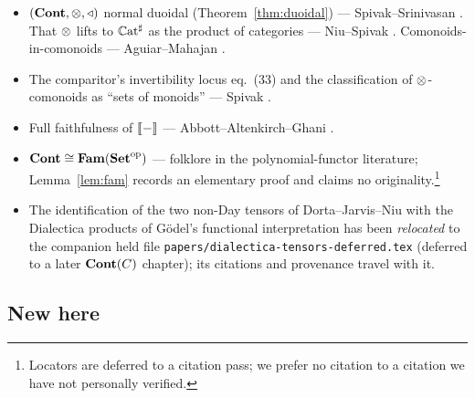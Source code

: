 \begin{itemize}[nosep]
  container is a polynomial comonad), with cofunctors for morphisms ---
  Ahman--Uustalu \cite{AhmanUustalu}; in $\tri$-comonoid form the $\mathcal C=1$
  case of Dorta--Jarvis--Niu \cite[Thm.~4.3]{DJN23}. We claim no part of this
  identification as new: only its Lean formalisation
  (\texttt{Comonoid.lean}, \texttt{ComonoidConverse.lean}, both round trips) is
  ours, and we believe it the first machine-checked proof of the equivalence.
\item $(\mathbf{Cont},\mathbin{\otimes},\mathbin{\triangleleft})$ normal duoidal (Theorem~\ref{thm:duoidal}) ---
  Spivak--Srinivasan \cite[eq.~(29)]{SpivakSrinivasan}. That $\mathbin{\otimes}$ lifts to
  $\mathbb{C}\mathrm{at}^{\sharp}$ as the product of categories --- Niu--Spivak
  \cite[Prop.~8.79]{NiuSpivak}. Comonoids-in-comonoids --- Aguiar--Mahajan
  \cite{AguiarMahajan}.
\item The comparitor's invertibility locus eq.~(33) and the classification of
  $\mathbin{\otimes}$-comonoids as ``sets of monoids'' --- Spivak \cite{SpivakRef}.
\item Full faithfulness of $\llbracket - \rrbracket$ --- Abbott--Altenkirch--Ghani \cite{AAG05}.
\item $\mathbf{Cont}\cong\mathbf{Fam}(\mathbf{Set}^{\mathrm{op}})$ --- folklore in the polynomial-functor
  literature; Lemma~\ref{lem:fam} records an elementary proof and claims no
  originality.\footnote{Locators are deferred to a citation pass; we prefer no
  citation to a citation we have not personally verified.}
\item The identification of the two non-Day tensors of Dorta--Jarvis--Niu with
  the Dialectica products of G\"odel's functional interpretation has been
  \emph{relocated} to the companion held file
  \texttt{papers/dialectica-tensors-deferred.tex} (deferred to a later
  $\mathbf{Cont}(C)$ chapter); its citations and provenance travel with it.
\end{itemize}

\subsection*{New here}

